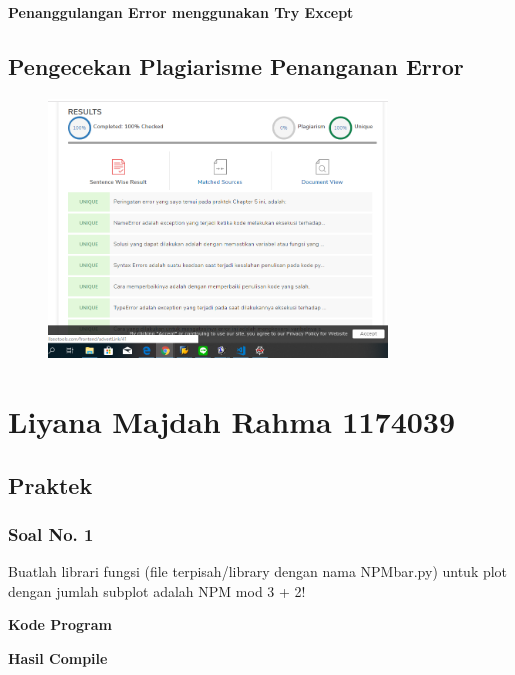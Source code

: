 \textbf{Penanggulangan Error menggunakan Try Except}


\subsection{Pengecekan Plagiarisme Penanganan Error}
\begin{figure}[H]
	\includegraphics[width=9cm]{figures/6/Praktek/1174056/Plagiarismeerror.png}
	\centering
\end{figure}
\section{Liyana Majdah Rahma 1174039}
\subsection{Praktek}
\subsubsection{Soal No. 1}
\hfill \break
Buatlah librari fungsi (file terpisah/library dengan nama NPMbar.py) untuk plot dengan jumlah subplot adalah NPM mod 3 + 2!

\hfill \break
\textbf{Kode Program}



\hfill \break
\textbf{Hasil Compile}

